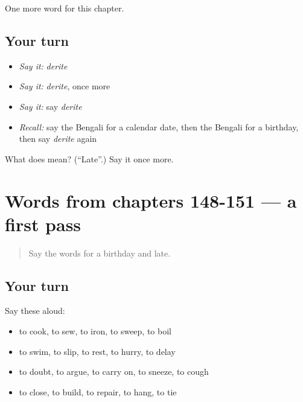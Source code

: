 \begin{grammarlens}[title={What you've built}]
One more word for this chapter.
\end{grammarlens}

\subsection*{Your turn}
\begin{itemize}
\raggedright
  \item \emph{Say it:} \emph{derite}
  \item \emph{Say it:} \emph{derite}, once more
  \item \emph{Say it:} say \emph{derite}
  \item \emph{Recall:} say the Bengali for a calendar date, then the Bengali for a birthday, then say \emph{derite} again
\end{itemize}

\begin{tcolorbox}[breakable,colback=teal!4,colframe=teal!35!black,title={Before you move on}]
What does  mean? (\textquotedblleft{}Late\textquotedblright{}.) Say it once more.
\end{tcolorbox}
\section[(dialogue)]{Words from chapters 148-151 — a first pass}

\label{lesson:BN-R156-first-pass-words-from-chapters-148-151}



\begin{quote}
Say the words for a birthday and late.
\end{quote}

\subsection*{Your turn}
Say these aloud:

\begin{itemize}
\raggedright
  \item to cook, to sew, to iron, to sweep, to boil
  \item to swim, to slip, to rest, to hurry, to delay
  \item to doubt, to argue, to carry on, to sneeze, to cough
  \item to close, to build, to repair, to hang, to tie
\end{itemize}

